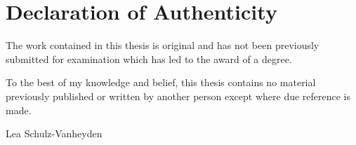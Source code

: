 \documentclass[toc=bibliography,toc=listof, dvipsnames,table, 12pt, a4paper, abstracton]{scrreprt}
\begin{document}
\newpage\null\thispagestyle{empty}\newpage



\newpage\null\thispagestyle{empty}\newpage

\tableofcontents
\pagestyle{empty} 

\listoffigures




\newpage\null\thispagestyle{empty}\newpage

\newpage
\pagestyle{plain}
\setcounter{page}{1}








\appendix




\renewcommand{\bibname}{References}



\chapter*{Declaration of Authenticity}
The work contained in this thesis is original and has not been previously submitted for examination which has led to the award of a degree.
\par\bigskip 
To the best of my knowledge and belief, this thesis contains no material previously published or written by another person except where due reference is made. 

\par\bigskip      
\par\bigskip  


\par\bigskip   

\par\bigskip   

\par\bigskip   

Lea Schulz-Vanheyden
\end{document}
